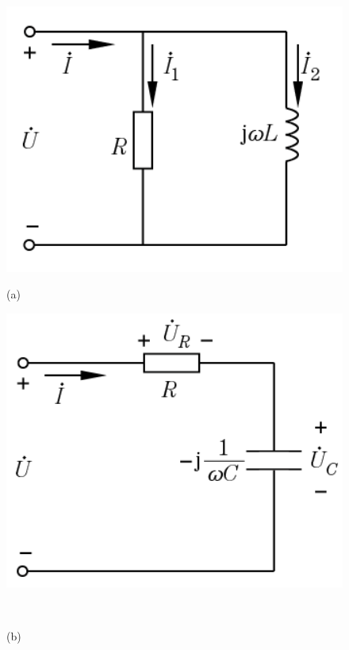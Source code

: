 \documentclass[hyperref, UTF8]{ctexart}
\begin{document}
\begin{figure}[!htb]
\centering
\begin{minipage}[t]{0.231\textwidth}
\centering
\includegraphics[width=1\textwidth]{p11-5-a.png}
\caption*{(a)}
\end{minipage}
\begin{minipage}[t]{0.236\textwidth}
\centering
\includegraphics[width=1\textwidth]{p11-5-b.png}
\caption*{(b)}
\end{minipage}
\\
\begin{minipage}[t]{0.218\textwidth}
\centering

\end{minipage}
\end{figure}
\end{document}
